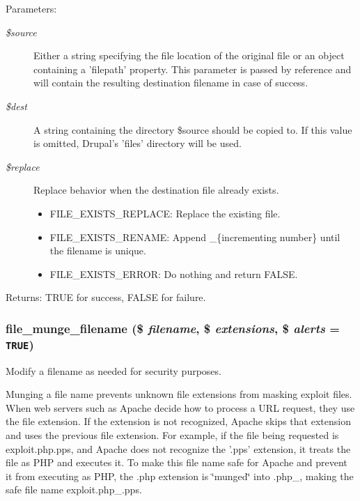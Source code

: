 \begin{Desc}
\item[Parameters:]
\begin{description}
\item[{\em \$source}]Either a string specifying the file location of the original file or an object containing a 'filepath' property. This parameter is passed by reference and will contain the resulting destination filename in case of success. \item[{\em \$dest}]A string containing the directory \$source should be copied to. If this value is omitted, Drupal's 'files' directory will be used. \item[{\em \$replace}]Replace behavior when the destination file already exists.\begin{itemize}
\item FILE\_\-EXISTS\_\-REPLACE: Replace the existing file.\item FILE\_\-EXISTS\_\-RENAME: Append \_\-\{incrementing number\} until the filename is unique.\item FILE\_\-EXISTS\_\-ERROR: Do nothing and return FALSE. \end{itemize}
\end{description}
\end{Desc}
\begin{Desc}
\item[Returns:]TRUE for success, FALSE for failure. \end{Desc}
\hypertarget{group__file_ge5f97959982c78dfde2f806757c21368}{
\subsubsection[{file\_\-munge\_\-filename}]{\setlength{\rightskip}{0pt plus 5cm}file\_\-munge\_\-filename (\$ {\em filename}, \/  \$ {\em extensions}, \/  \$ {\em alerts} = {\tt TRUE})}}
\label{group__file_ge5f97959982c78dfde2f806757c21368}


Modify a filename as needed for security purposes.

Munging a file name prevents unknown file extensions from masking exploit files. When web servers such as Apache decide how to process a URL request, they use the file extension. If the extension is not recognized, Apache skips that extension and uses the previous file extension. For example, if the file being requested is exploit.php.pps, and Apache does not recognize the '.pps' extension, it treats the file as PHP and executes it. To make this file name safe for Apache and prevent it from executing as PHP, the .php extension is \char`\"{}munged\char`\"{} into .php\_\-, making the safe file name exploit.php\_\-.pps.

